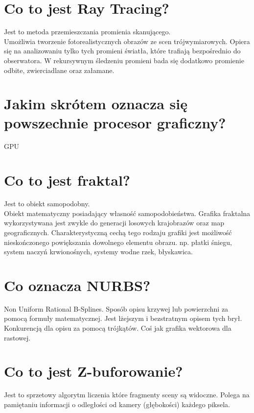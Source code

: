 \section{Co to jest Ray Tracing?}
Jest to metoda przemieszczania promienia skanującego.\\
Umożliwia tworzenie fotorealistycznych obrazów ze scen trójwymiarowych. Opiera się na analizowaniu tylko tych promieni światła, które trafiają bezpośrednio do obserwatora. W rekursywnym śledzeniu promieni bada się dodatkowo promienie odbite, zwierciadlane oraz załamane.

\section{Jakim skrótem oznacza się powszechnie procesor graficzny?}
GPU

\section{Co to jest fraktal?}
Jest to obiekt samopodobny. \\ Obiekt matematyczny posiadający własność samopodobieństwa. Grafika fraktalna wykorzystywana jest zwykle do generacji losowych krajobrazów oraz map geograficznych. Charakterystyczną cechą tego rodzaju grafiki jest możliwość nieskończonego powiększania dowolnego elementu obrazu. np. płatki śniegu, system naczyń krwionośnych, systemy wodne rzek, błyskawica.

\section{Co oznacza NURBS?}
Non Uniform Rational B-Splines. Sposób opisu krzywej lub powierzchni za pomocą formuły matematycznej. Jest lżejszym i bezstratnym opisem tych brył. Konkurencją dla opisu za pomocą trójkątów. Coś jak grafika wektorowa dla rastowej.

\section{Co to jest Z-buforowanie?}
Jest to sprzetowy algorytm liczenia które fragmenty sceny są widoczne.
Polega na pamiętaniu informacji o odległości od kamery (głębokości) każdego piksela.
